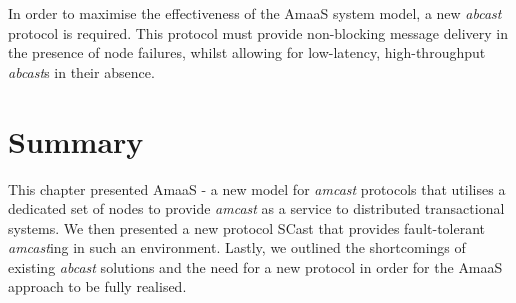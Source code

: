 In order to maximise the effectiveness of the \textsf{AmaaS} system model, a new \emph{abcast} protocol is required.  This protocol must provide non-blocking message delivery in the presence of node failures, whilst allowing for low-latency, high-throughput \emph{abcast}s in their absence.  


\section{Summary}
This chapter presented \textsf{AmaaS} - a new model for \emph{amcast} protocols that utilises a dedicated set of nodes to provide \emph{amcast} as a service to distributed transactional systems.  We then presented a new protocol \textsf{SCast} that provides fault-tolerant \emph{amcast}ing in such an environment.  Lastly, we outlined the shortcomings of existing \emph{abcast} solutions and the need for a new protocol in order for the \textsf{AmaaS} approach to be fully realised. 
